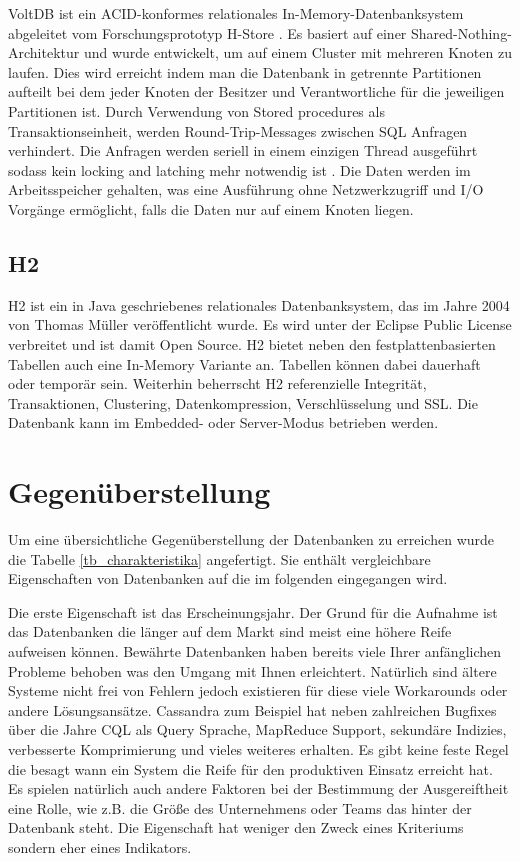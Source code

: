 VoltDB \cite{volt2013a} ist ein ACID-konformes relationales In-Memory-Datenbanksystem abgeleitet vom Forschungsprototyp H-Store \cite{kallman08}. Es basiert auf einer Shared-Nothing-Architektur und wurde entwickelt, um auf einem Cluster mit mehreren Knoten zu laufen. Dies wird erreicht indem man die Datenbank in getrennte Partitionen aufteilt bei dem jeder Knoten der Besitzer und Verantwortliche für die jeweiligen Partitionen ist. Durch Verwendung von Stored procedures als Transaktionseinheit, werden Round-Trip-Messages zwischen SQL Anfragen verhindert. Die Anfragen werden seriell in einem einzigen Thread ausgeführt sodass kein locking and latching mehr notwendig ist \cite{volt2013b}. Die Daten werden im Arbeitsspeicher gehalten, was eine Ausführung ohne Netzwerkzugriff und I/O Vorgänge ermöglicht, falls die Daten nur auf einem Knoten liegen.  

\subsection{H2} 

H2 ist ein in Java geschriebenes relationales Datenbanksystem, das im Jahre 2004 von Thomas Müller veröffentlicht wurde. Es wird unter der Eclipse Public License verbreitet und ist damit Open Source. H2 bietet neben den festplattenbasierten Tabellen auch eine In-Memory Variante an. Tabellen können dabei dauerhaft oder temporär sein. Weiterhin beherrscht H2 referenzielle Integrität, Transaktionen, Clustering, Datenkompression, Verschlüsselung und SSL. Die Datenbank kann im Embedded- oder Server-Modus betrieben werden.

\section{Gegenüberstellung} 
\label{ch:AnalyseDatenbanken:sec:Gegenüberstellung}

Um eine übersichtliche Gegenüberstellung der Datenbanken zu erreichen wurde die Tabelle \ref{tb_charakteristika} angefertigt. Sie enthält vergleichbare Eigenschaften von Datenbanken auf die im folgenden eingegangen wird. 

Die erste Eigenschaft ist das Erscheinungsjahr. Der Grund für die Aufnahme ist das Datenbanken die länger auf dem Markt sind meist eine höhere Reife aufweisen können. Bewährte Datenbanken haben bereits viele Ihrer anfänglichen Probleme behoben was den Umgang mit Ihnen erleichtert. Natürlich sind ältere Systeme nicht frei von Fehlern jedoch existieren für diese viele Workarounds oder andere Lösungsansätze. Cassandra zum Beispiel hat neben zahlreichen Bugfixes über die Jahre CQL als Query Sprache, MapReduce Support, sekundäre Indizies, verbesserte Komprimierung und vieles weiteres erhalten. Es gibt keine feste Regel die besagt wann ein System die Reife für den produktiven Einsatz erreicht hat. Es spielen natürlich auch andere Faktoren bei der Bestimmung der Ausgereiftheit eine Rolle, wie z.B. die Größe des Unternehmens oder Teams das hinter der Datenbank steht. Die Eigenschaft hat weniger den Zweck eines Kriteriums sondern eher eines Indikators. 

